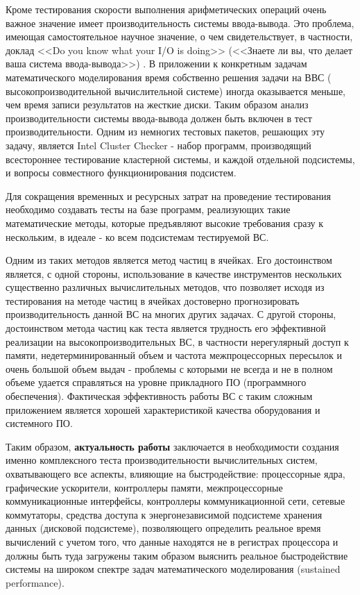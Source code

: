  Кроме тестирования скорости выполнения арифметических операций очень важное значение имеет производительность системы ввода-вывода. Это проблема, имеющая самостоятельное научное значение, о чем свидетельствует, в частности, доклад  <<Do you know what your I/O is doing>> (<<Знаете ли вы, что делает ваша система ввода-вывода>>) \cite{IOdoing}. В приложении к конкретным задачам математического моделирования время собственно решения задачи на ВВС ( высокопроизводительной вычислительной системе) иногда оказывается меньше, чем время записи результатов на жесткие диски.
 Таким образом анализ производительности системы ввода-вывода должен быть включен в тест производительности.
 Одним из немногих тестовых пакетов, решающих эту задачу, является Intel Cluster Checker - набор программ, производящий всестороннее тестирование кластерной системы, и каждой отдельной подсистемы, и вопросы совместного функционирования подсистем. 
 
 Для сокращения временных и ресурсных затрат на проведение тестирования необходимо создавать тесты на базе программ, реализующих такие математические методы, которые предъявляют высокие требования сразу к нескольким, в идеале - ко всем подсистемам тестируемой ВС. 
 
 Одним из таких методов является метод частиц в ячейках. Его достоинством является, с одной стороны, использование в качестве инструментов нескольких существенно различных вычислительных методов, что позволяет исходя из тестирования на методе частиц в ячейках достоверно прогнозировать производительность данной ВС на многих других задачах. С другой стороны, достоинством метода частиц как теста является трудность его эффективной реализации на высокопроизводительных ВС, в частности нерегулярный доступ к памяти, недетерминированный объем и частота межпроцессорных пересылок и очень большой объем выдач - проблемы с которыми не всегда и не в полном объеме удается справляться на уровне прикладного ПО (программного обеспечения). Фактическая эффективность работы ВС с таким сложным приложением является хорошей характеристикой качества оборудования и системного ПО.
 
 Таким образом,\textbf{ актуальность работы} заключается в необходимости создания именно комплексного теста производительности вычислительных систем, охватывающего все аспекты, влияющие на быстродействие: процессорные ядра, графические ускорители, контроллеры памяти, межпроцессорные коммуникационные интерфейсы, контроллеры коммуникационной сети, сетевые коммутаторы, средства доступа к энергонезависимой  подсистеме хранения данных (дисковой подсистеме), позволяющего определить  реальное время вычислений с учетом того, что данные находятся не в регистрах процессора и должны быть туда загружены таким образом выяснить реальное быстродействие системы на широком спектре задач математического моделирования (sustained performance). 


